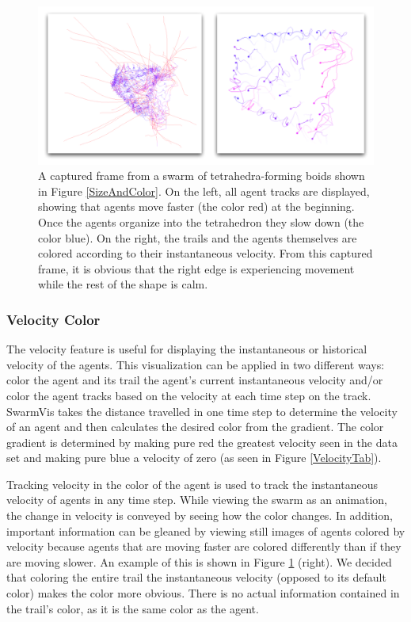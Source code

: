 \documentclass[conference]{IEEEtran}
\begin{document}
\begin{figure}
\centering
\includegraphics[scale=.666667]{images/velocity.pdf}
\caption{
A captured frame from a swarm of tetrahedra-forming boids shown in Figure \ref{SizeAndColor}.
On the left, all agent tracks are displayed, showing that agents move faster (the color red) at the beginning.
Once the agents organize into the tetrahedron they slow down (the color blue).
On the right, the trails and the agents themselves are colored according to their instantaneous velocity.
From this captured frame, it is obvious that the right edge is experiencing movement while the rest of the
shape is calm. }
\label{Velocity}
\end{figure}

\subsubsection{Velocity Color}

The velocity feature is useful for displaying the instantaneous or historical velocity of the agents.
This visualization can be applied in two different ways: color the agent and its trail the agent's current instantaneous
velocity and/or color the agent tracks based on the velocity at each time step on the track.
SwarmVis takes the distance travelled in one time step to determine the velocity of an agent and then calculates the 
desired color from the gradient.
The color gradient is determined by making pure red the greatest velocity seen in the data set and making pure blue
a velocity of zero (as seen in Figure \ref{VelocityTab}).

Tracking velocity in the color of the agent is used to track the instantaneous velocity of agents in any time step.
While viewing the swarm as an animation, the change in velocity is conveyed by seeing how the color changes.
In addition, important information can be gleaned by viewing still images of agents colored by velocity because
agents that are moving faster are colored differently than if they are moving slower.
An example of this is shown in Figure \ref{Velocity} (right).
We decided that coloring the entire trail the instantaneous velocity (opposed to its default color)
makes the color more obvious.
There is no actual information contained in the trail's color, as it is the same color as the agent.
\end{document}

